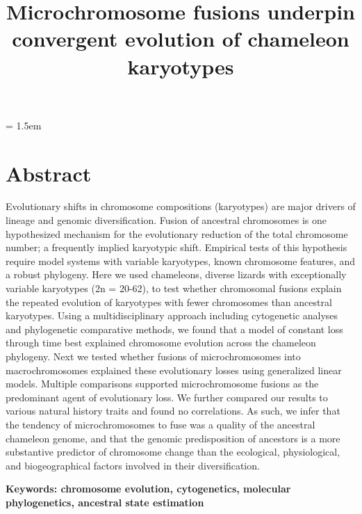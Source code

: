 \documentclass[a4paper, 12pt]{article}
\title{Microchromosome fusions underpin convergent evolution of chameleon karyotypes}
\begin{document}
\modulolinenumbers[1]   %

\mstitlepage

\parindent = 1.5em
\addtolength{\parskip}{.9em}

\raggedright

\newpage
\section{Abstract}

Evolutionary shifts in chromosome compositions (karyotypes) are major drivers of lineage and genomic diversification. 
Fusion of ancestral chromosomes is one hypothesized mechanism for the evolutionary reduction of the total chromosome number; a frequently implied karyotypic shift. 
Empirical tests of this hypothesis require model systems with variable karyotypes, known chromosome features, and a robust phylogeny. 
Here we used chameleons, diverse lizards with exceptionally variable karyotypes (2n = 20-62), to test whether chromosomal fusions explain the repeated evolution of karyotypes with fewer chromosomes than ancestral karyotypes. 
Using a multidisciplinary approach including cytogenetic analyses and phylogenetic comparative methods, we found that a model of constant loss through time best explained chromosome evolution across the chameleon phylogeny. 
Next we tested whether fusions of microchromosomes into macrochromosomes explained these evolutionary losses using generalized linear models. 
Multiple comparisons supported microchromosome fusions as the predominant agent of evolutionary loss. 
We further compared our results to various natural history traits and found no correlations. 
As such, we infer that the tendency of microchromosomes to fuse was a quality of the ancestral chameleon genome, and that the genomic predisposition of ancestors is a more substantive predictor of chromosome change than the ecological, physiological, and biogeographical factors involved in their diversification.

\textbf{Keywords: chromosome evolution, cytogenetics, molecular phylogenetics, ancestral state estimation}

\end{document}
